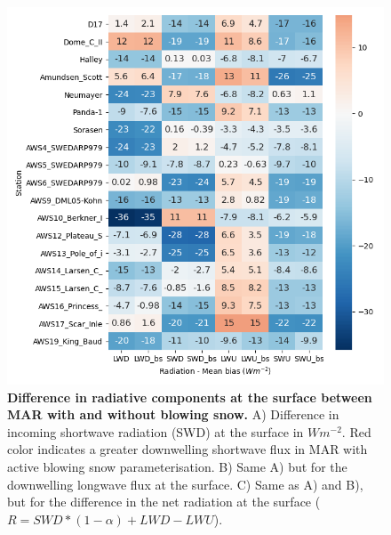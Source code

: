 \documentclass[12pt]{article}
\begin{document}
\begin{figure}[H]
	\includegraphics[scale=0.9,center]{heatmap_all_mb.png}
	\caption{\textbf{Difference in radiative components at the surface between MAR with and without blowing snow.} A) Difference in incoming shortwave radiation (SWD) at the surface in $Wm^{-2}$. Red color indicates a greater downwelling shortwave flux in MAR with active blowing snow parameterisation. B) Same A) but for the downwelling longwave flux at the surface. C) Same as A) and B), but for the difference in the net radiation at the surface ($R= SWD * (1 - \alpha) + LWD - LWU$).}
	\label{fig:heat_all}
\end{figure}
\end{document}
